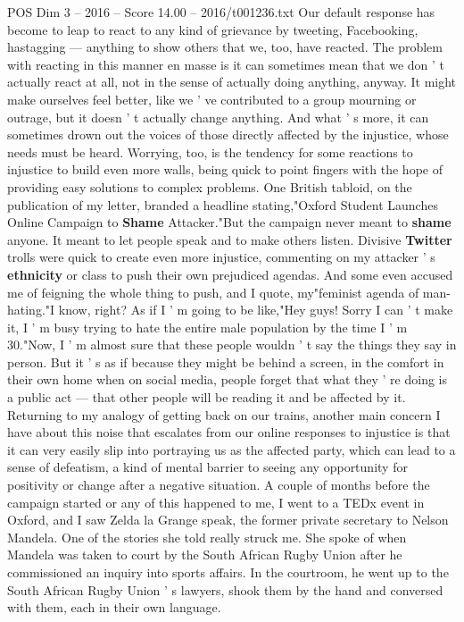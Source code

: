 \begin{textsample}{POS Dim 3 – 2016 – Score 14.00 – 2016/t001236.txt}
Our default response has become to leap to react to any kind of grievance by tweeting, Facebooking, hastagging — anything to show others that we, too, have reacted.
The problem with reacting in this manner en masse is it can sometimes mean that we don ' t actually react at all, not in the sense of actually doing anything, anyway.
It might make ourselves feel better, like we ' ve contributed to a group mourning or outrage, but it doesn ' t actually change anything.
And what ' s more, it can sometimes drown out the voices of those directly affected by the injustice, whose needs must be heard.
Worrying, too, is the tendency for some reactions to injustice to build even more walls, being quick to point fingers with the hope of providing easy solutions to complex problems.
One British tabloid, on the publication of my letter, branded a headline stating,"Oxford Student Launches Online Campaign to \textbf{Shame} Attacker."But the campaign never meant to \textbf{shame} anyone.
It meant to let people speak and to make others listen.
Divisive \textbf{Twitter} trolls were quick to create even more injustice, commenting on my attacker ' s \textbf{ethnicity} or class to push their own prejudiced agendas.
And some even accused me of feigning the whole thing to push, and I quote, my"feminist agenda of man-hating."I know, right?
As if I ' m going to be like,"Hey guys!
Sorry I can ' t make it, I ' m busy trying to hate the entire male population by the time I ' m 30."Now, I ' m almost sure that these people wouldn ' t say the things they say in person.
But it ' s as if because they might be behind a screen, in the comfort in their own home when on social media, people forget that what they ' re doing is a public act — that other people will be reading it and be affected by it.
Returning to my analogy of getting back on our trains, another main concern I have about this noise that escalates from our online responses to injustice is that it can very easily slip into portraying us as the affected party, which can lead to a sense of defeatism, a kind of mental barrier to seeing any opportunity for positivity or change after a negative situation.
A couple of months before the campaign started or any of this happened to me, I went to a TEDx event in Oxford, and I saw Zelda la Grange speak, the former private secretary to Nelson Mandela.
One of the stories she told really struck me.
She spoke of when Mandela was taken to court by the South African Rugby Union after he commissioned an inquiry into sports affairs.
In the courtroom, he went up to the South African Rugby Union ' s lawyers, shook them by the hand and conversed with them, each in their own language.

\end{textsample}

